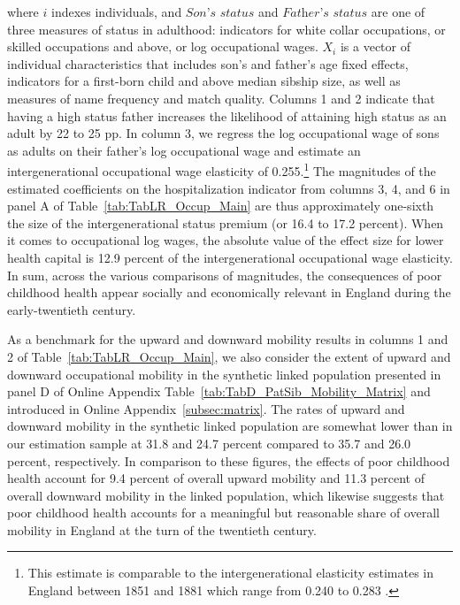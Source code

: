 \documentclass[12pt,english]{article}
\begin{document}
\noindent where $i$ indexes individuals, and $\textit{Son's status}$ and $\textit{Father's status}$ are one of three measures of status in adulthood: indicators for white collar occupations, or skilled occupations and above, or log occupational wages. $\mathit{X}_{i}$ is a vector of individual characteristics that includes son's and father's age fixed effects, indicators for a first-born child and above median sibship size, as well as measures of name frequency and match quality. Columns 1 and 2 indicate that having a high status father increases the likelihood of attaining high status as an adult by 22 to 25 pp. In column 3, we regress the log occupational wage of sons as adults on their father's log occupational wage and estimate an intergenerational occupational wage elasticity of 0.255.\footnote{This estimate is comparable to the intergenerational elasticity estimates in England between 1851 and 1881 which range from 0.240 to 0.283 \citep{Long2006}.} The magnitudes of the estimated coefficients on the hospitalization indicator from columns 3, 4, and 6 in panel A of Table~\ref{tab:TabLR_Occup_Main} are thus approximately one-sixth the size of the intergenerational status premium (or 16.4 to 17.2 percent). When it comes to occupational log wages, the absolute value of the effect size for lower health capital is 12.9 percent of the intergenerational occupational wage elasticity. In sum, across the various comparisons of magnitudes, the consequences of poor childhood health appear socially and economically relevant in England during the early-twentieth century.

As a benchmark for the upward and downward mobility results in columns 1 and 2 of Table~\ref{tab:TabLR_Occup_Main}, we also consider the extent of upward and downward occupational mobility in the synthetic linked population presented in panel D of Online Appendix Table~\ref{tab:TabD_PatSib_Mobility_Matrix} and introduced in Online Appendix~\ref{subsec:matrix}. The rates of upward and downward mobility in the synthetic linked population are somewhat lower than in our estimation sample at 31.8 and 24.7 percent compared to 35.7 and 26.0 percent, respectively. In comparison to these figures, the effects of poor childhood health account for 9.4 percent of overall upward  mobility and 11.3 percent of overall downward mobility in the linked population, which likewise suggests that poor childhood health accounts for a meaningful but reasonable share of overall mobility in England at the turn of the twentieth century.
\end{document}

